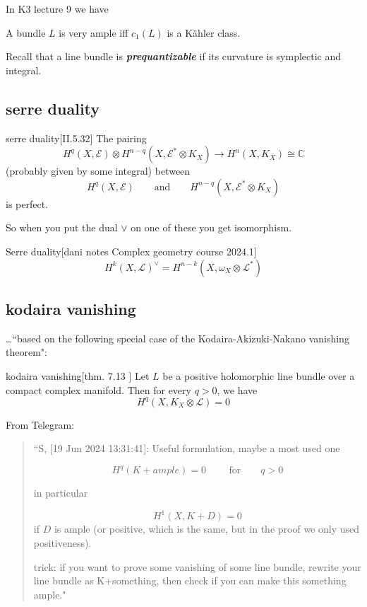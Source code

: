 In K3 lecture 9 we have

\begin{thm}[Kodaira]\leavevmode
A bundle \(L\) is very ample iff \(c_1(L)\) is a Kähler class.
\end{thm}

\begin{thing7}{Recall}\leavevmode
that a line bundle is \textit{\textbf{prequantizable}} if its curvature is symplectic and integral.
\end{thing7}

\subsection{serre duality}
\begin{thing6}{serre duality}[II.5.32\cite{voi}]\label{thm:5.32}\leavevmode
The pairing
\[H^{q}(X,\mathcal{E})\otimes H^{n-q}(X,\mathcal{E}^*\otimes K_X)\to H^{n}(X,K_X)\cong\mathbb{C}\]
(probably given by some integral) between
\[H^{q}(X,\mathcal{E})\qquad \text{and} \qquad H^{n-q}(X,\mathcal{E}^* \otimes K_X)\]
is perfect.
\end{thing6}
So when you put the dual \(\vee\) on one of these you get isomorphism.


\begin{thing6}{Serre duality}[dani notes Complex geometry course 2024.1]\leavevmode
\[H^{k}(X,\mathcal{L})^{\vee}=H^{n-k}(X,\omega_X \otimes \mathcal{L}^*)\]
\end{thing6}

\subsection{kodaira vanishing}
…``based on the following special case of the Kodaira-Akizuki-Nakano vanishing theorem":
\begin{thing6}{kodaira vanishing}[thm. 7.13 \cite{voi}]\label{thm:kodaira vanishing}\leavevmode
	Let \(L\) be a positive holomorphic line bundle over a compact complex manifold. Then for every \(q>0\), we have
	\[\boxed{H^{q}(X,K_X \otimes \mathcal{L})=0}\]
\end{thing6}

From Telegram:

\begin{quotation}
	``S, [19 Jun 2024 13:31:41]:
Useful formulation, maybe a most used one

\[H^q(K+ample) = 0 \qquad \text{ for}\qquad  q>0\]

in particular

\[H^1(X,K+D) = 0\] if \(D\) is ample (or positive, which is the same, but in the proof we only used positiveness).



trick: if you want to prove some vanishing of some line bundle, rewrite your line bundle as K+something, then check if you can make this something ample."
\end{quotation}
